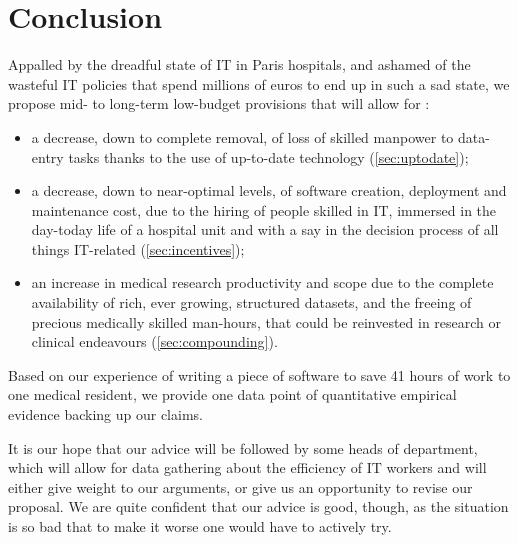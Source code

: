\documentclass[nobib]{tufte-handout}
\begin{document}
\section{Conclusion}

Appalled by the dreadful state of IT in Paris hospitals, and ashamed of the wasteful IT policies that spend millions of euros to end up in such a sad state, we propose mid- to long-term low-budget provisions that will allow for :
\begin{itemize}
\item a decrease, down to complete removal, of loss of skilled manpower to data-entry tasks thanks to the use of up-to-date technology (\autoref{sec:uptodate});
\item a decrease, down to near-optimal levels, of software creation, deployment and maintenance cost, due to the hiring of people skilled in IT, immersed in the day-today life of a hospital unit and with a say in the decision process of all things IT-related (\autoref{sec:incentives});
\item an increase in medical research productivity and scope due to the complete availability of rich, ever growing, structured datasets, and the freeing of precious medically skilled man-hours, that could be reinvested in research or clinical endeavours (\autoref{sec:compounding}).
\end{itemize}

Based on our experience of writing a piece of software to save 41 hours of work to one medical resident, we provide one data point of quantitative empirical evidence backing up our claims.

It is our hope that our advice will be followed by some heads of department, which will allow for data gathering about the efficiency of IT workers and will either give weight to our arguments, or give us an opportunity to revise our proposal. We are quite confident that our advice is good, though, as the situation is so bad that to make it worse one would have to actively try.

\printbibliography
\end{document}
